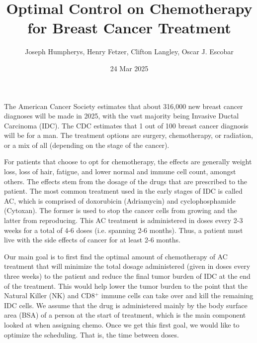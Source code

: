 \documentclass[12pt, oneside]{article}   	%
\title{Optimal Control on Chemotherapy for Breast Cancer Treatment}
\date{24 Mar 2025}							%
\author{Joseph Humpherys, Henry Fetzer, Clifton Langley, Oscar J. Escobar}
\begin{document}
\maketitle

The American Cancer Society estimates that about 316,000 new breast cancer diagnoses will be made in 2025, with the vast majority being Invasive Ductal Carcinoma (IDC).
The CDC estimates that 1 out of 100 breast cancer diagnosis will be for a man.
The treatment options are surgery, chemotherapy, or radiation, or a mix of all (depending on the stage of the cancer). 

For patients that choose to opt for chemotherapy, the effects are generally weight loss, loss of hair, fatigue, and lower normal and  immune cell count, amongst others.
The effects stem from the dosage of the drugs that are prescribed to the patient.
The most common treatment used in the early stages of IDC is called AC, which is comprised of doxorubicin (Adriamycin) and cyclophosphamide (Cytoxan).
The former is used to stop the cancer cells from growing and the latter from reproducing.
This AC treatment is administered in doses every 2-3 weeks for a total of 4-6 doses (i.e. spanning 2-6 months).
Thus, a patient must live with the side effects of cancer for at least 2-6 months.

Our main goal is to first find the optimal amount of chemotherapy of AC treatment that will minimize the total dosage administered (given in doses every three weeks) to the patient and reduce the final tumor burden of IDC at the end of the treatment.
This would help lower the tumor burden to the point that the Natural Killer (NK) and CD8$^+$ immune cells can take over and kill the remaining IDC cells.
We assume that the drug is administered mainly by the body surface area (BSA) of a person at the start of treatment, which is the main component looked at when assigning chemo.
Once we get this first goal, we would like to optimize the scheduling.
That is, the time between doses.
\end{document}
